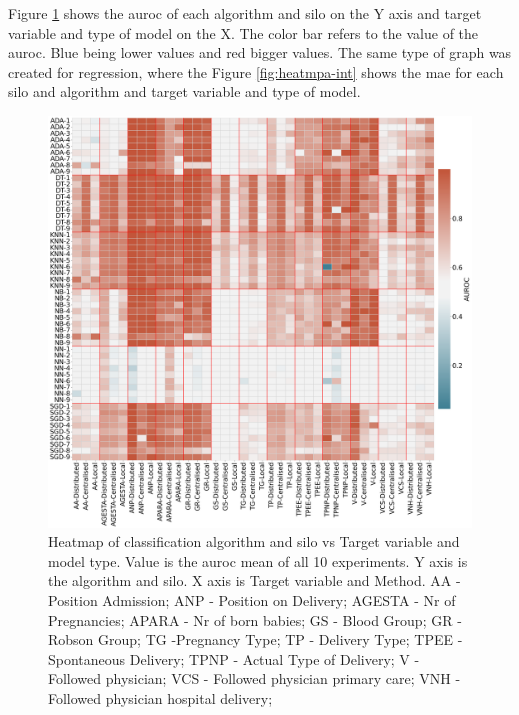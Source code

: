 





Figure \ref{fig:heatmap-cat} shows the \ac{auroc} of each algorithm and silo on the Y axis and target variable and type of model on the X. The color bar refers to the value of the \ac{auroc}. Blue being lower values and red bigger values. The same type of graph was created for regression, where the Figure \ref{fig:heatmpa-int} shows the \ac{mae} for each silo and algorithm and target variable and type of model. 



\begin{figure}[h!]
\centering
\captionsetup{justification=centering}

\caption[Heatmap of classification algorithm and silo vs Target variable and model type.]{Heatmap of classification algorithm and silo vs Target variable and model type. Value is the \ac{auroc} mean of all 10 experiments. Y axis is the algorithm and silo. X axis is Target variable and Method. AA - Position Admission; ANP - Position on Delivery; AGESTA - Nr of Pregnancies; APARA - Nr of born babies; GS - Blood Group; GR - Robson Group; TG -Pregnancy Type; TP - Delivery Type; TPEE - Spontaneous Delivery; TPNP - Actual Type of Delivery; V - Followed physician; VCS - Followed physician primary care; VNH - Followed physician hospital delivery;}\label{fig:heatmap-cat} 
\includegraphics[scale=0.22]{figures/heatmap-class.png}
\end{figure}

